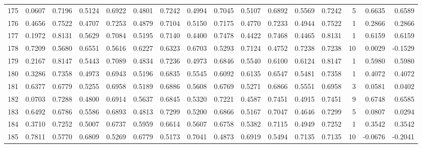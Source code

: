 \begin{tabular}{lrrrrrrrrrrrrrrr}
175 &      0.0607 &  0.7196 &  0.5124 &  0.6922 &  0.4801 &  0.7242 &  0.4994 &  0.7045 &  0.5107 &  0.6892 &   0.5569 &     0.7242 &      5 &                    0.6635 &                     0.6589 \\
176 &      0.4656 &  0.7522 &  0.4707 &  0.7253 &  0.4879 &  0.7104 &  0.5150 &  0.7175 &  0.4770 &  0.7233 &   0.4944 &     0.7522 &      1 &                    0.2866 &                     0.2866 \\
177 &      0.1972 &  0.8131 &  0.5629 &  0.7084 &  0.5195 &  0.7140 &  0.4400 &  0.7478 &  0.4422 &  0.7468 &   0.4465 &     0.8131 &      1 &                    0.6159 &                     0.6159 \\
178 &      0.7209 &  0.5680 &  0.6551 &  0.5616 &  0.6227 &  0.6323 &  0.6703 &  0.5293 &  0.7124 &  0.4752 &   0.7238 &     0.7238 &     10 &                    0.0029 &                    -0.1529 \\
179 &      0.2167 &  0.8147 &  0.5443 &  0.7089 &  0.4834 &  0.7236 &  0.4973 &  0.6846 &  0.5540 &  0.6100 &   0.6124 &     0.8147 &      1 &                    0.5980 &                     0.5980 \\
180 &      0.3286 &  0.7358 &  0.4973 &  0.6943 &  0.5196 &  0.6835 &  0.5545 &  0.6092 &  0.6135 &  0.6547 &   0.5481 &     0.7358 &      1 &                    0.4072 &                     0.4072 \\
181 &      0.6377 &  0.6779 &  0.5255 &  0.6958 &  0.5189 &  0.6886 &  0.5608 &  0.6769 &  0.5271 &  0.6866 &   0.5551 &     0.6958 &      3 &                    0.0581 &                     0.0402 \\
182 &      0.0703 &  0.7288 &  0.4800 &  0.6914 &  0.5637 &  0.6845 &  0.5320 &  0.7221 &  0.4587 &  0.7451 &   0.4915 &     0.7451 &      9 &                    0.6748 &                     0.6585 \\
183 &      0.6492 &  0.6786 &  0.5586 &  0.6893 &  0.4813 &  0.7299 &  0.5200 &  0.6866 &  0.5167 &  0.7047 &   0.4646 &     0.7299 &      5 &                    0.0807 &                     0.0294 \\
184 &      0.3710 &  0.7252 &  0.5007 &  0.6737 &  0.5959 &  0.6614 &  0.5607 &  0.6758 &  0.5382 &  0.7115 &   0.4949 &     0.7252 &      1 &                    0.3542 &                     0.3542 \\
185 &      0.7811 &  0.5770 &  0.6809 &  0.5269 &  0.6779 &  0.5173 &  0.7041 &  0.4873 &  0.6919 &  0.5494 &   0.7135 &     0.7135 &     10 &                   -0.0676 &                    -0.2041 \\

\end{tabular}
